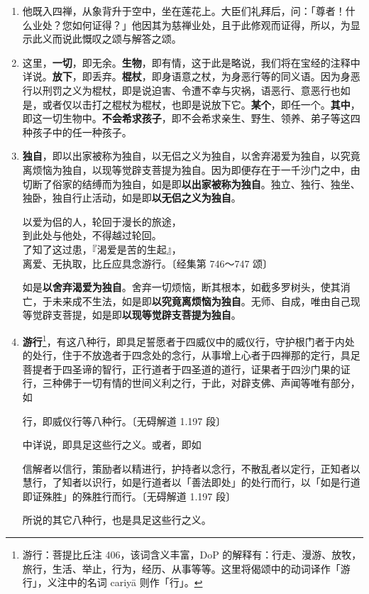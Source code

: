 \begin{enumerate}
\item 他既入四禅，从象背升于空中，坐在莲花上。大臣们礼拜后，问：「尊者！什么业处？您如何证得？」他因其为慈禅业处，且于此修观而证得，所以，为显示此义而说此慨叹之颂与解答之颂。
\item 这里，\textbf{一切}，即无余。\textbf{生物}，即有情，这于此是略说，我们将在宝经的注释中详说。\textbf{放下}，即丢弃。\textbf{棍杖}，即身语意之杖，为身恶行等的同义语。因为身恶行以刑罚之义为棍杖，即是说迫害、令遭不幸与灾祸，语恶行、意恶行也如是，或者仅以击打之棍杖为棍杖，也即是说放下它。\textbf{某个}，即任一个。\textbf{其中}，即这一切生物中。\textbf{不会希求孩子}，即不会希求亲生、野生、领养、弟子等这四种孩子中的任一种孩子。
\item \textbf{独自}，即以出家被称为独自，以无侣之义为独自，以舍弃渴爱为独自，以究竟离烦恼为独自，以现等觉辟支菩提为独自。因为即便存在于一千沙门之中，由切断了俗家的结缚而为独自，如是即\textbf{以出家被称为独自}。独立、独行、独坐、独卧，独自行止活动，如是即\textbf{以无侣之义为独自}。\begin{quoting}以爱为侣的人，轮回于漫长的旅途，\\到此处与他处，不得越过轮回。\\了知了这过患，『渴爱是苦的生起』，\\离爱、无执取，比丘应具念游行。{\bluefootnotesize 〔经集第 746～747 颂〕}\end{quoting}如是\textbf{以舍弃渴爱为独自}。舍弃一切烦恼，断其根本，如截多罗树头，使其消亡，于未来成不生法，如是即\textbf{以究竟离烦恼为独自}。无师、自成，唯由自己现等觉辟支菩提，如是即\textbf{以现等觉辟支菩提为独自}。
\item \textbf{游行}\footnote{游行：菩提比丘注 406，该词含义丰富，DoP 的解释有：行走、漫游、放牧，旅行，生活、举止，行为，经历、从事等等。这里将偈颂中的动词译作「游行」，义注中的名词 cariyā 则作「行」。}，有这八种行，即具足誓愿者于四威仪中的威仪行，守护根门者于内处的处行，住于不放逸者于四念处的念行，从事增上心者于四禅那的定行，具足菩提者于四圣谛的智行，正行道者于四圣道的道行，证果者于四沙门果的证行，三种佛于一切有情的世间义利之行，于此，对辟支佛、声闻等唯有部分，如\begin{quoting}行，即威仪行等八种行。{\bluefootnotesize 〔无碍解道 1.197 段〕}\end{quoting}中详说，即具足这些行之义。或者，即如\begin{quoting}信解者以信行，策励者以精进行，护持者以念行，不散乱者以定行，正知者以慧行，了知者以识行，如是行道者以「善法即处」的处行而行，以「如是行道即证殊胜」的殊胜行而行。{\bluefootnotesize 〔无碍解道 1.197 段〕}\end{quoting}所说的其它八种行，也是具足这些行之义。

\end{enumerate}
